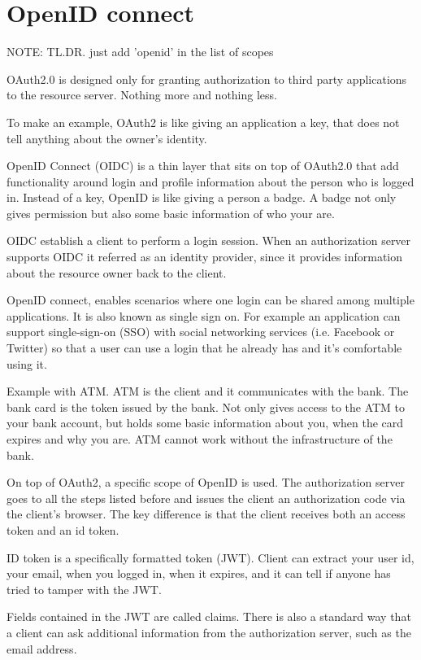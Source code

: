 \documentclass[11pt]{style}
\begin{document}
\section{OpenID connect}
\label{openid}

NOTE: TL.DR. just add 'openid' in the list of scopes

OAuth2.0 is designed only for granting authorization to third party applications
to the resource server. Nothing more and nothing less.

To make an example, OAuth2 is like giving an application a key, that does not
tell anything about the owner's identity.

OpenID Connect (OIDC) is a thin layer that sits on top of OAuth2.0 that add functionality around
login and profile information about the person who is logged in.
Instead of a key, OpenID is like giving a person a badge. A badge not only gives
permission but also some basic information of who your are.

OIDC establish a client to perform a login session.
When an authorization server supports OIDC it referred as an identity provider,
since it provides information about the resource owner back to the client.

OpenID connect, enables scenarios where one login can be shared among multiple
applications. It is also known as single sign on.
For example an application can support single-sign-on (SSO) with social networking services (i.e.
Facebook or Twitter) so that a user can use a login that he already has and it's
comfortable using it.

Example with ATM. ATM is the client and it communicates with the bank. The bank
card is the token issued by the bank. Not only gives access to the ATM to your
bank account, but holds some basic information about you, when the card expires
and why you are.
ATM cannot work without the infrastructure of the bank.

On top of OAuth2, a specific scope of OpenID is used. The authorization server
goes to all the steps listed before and issues the client an authorization code
via the client's browser.
The key difference is that the client receives both an access token and an id
token.

ID token is a specifically formatted token (JWT). Client can extract your user
id, your email, when you logged in, when it expires, and it can tell if anyone
has tried to tamper with the JWT.

Fields contained in the JWT are called claims.
There is also a standard way that a client can ask additional information from the
authorization server, such as the email address.
\end{document}
